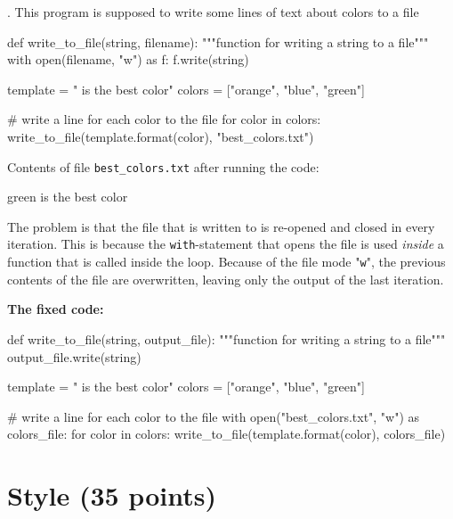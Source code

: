 . This program is supposed to write some lines of text about colors to a file

\begin{pythoncode}
def write_to_file(string, filename):
    """function for writing a string to a file"""
    with open(filename, "w") as f:
        f.write(string)

template    = "{} is the best color"
colors      = ["orange", "blue", "green"]

# write a line for each color to the file
for color in colors:
    write_to_file(template.format(color), "best_colors.txt")
\end{pythoncode}

\noindent Contents of file \texttt{best\_colors.txt} after running the code:

\begin{outputcode}
green is the best color
\end{outputcode}

\begin{solution}
    The problem is that the file that is written to is re-opened and closed in every iteration. This is because the \texttt{with}-statement that opens the file is used \textit{inside} a function that is called inside the loop. Because of the file mode "\texttt{w}", the previous contents of the file are overwritten, leaving only the output of the last iteration.

    \vspace{1em}

    \noindent \textbf{The fixed code:}

    \begin{pythoncode}
def write_to_file(string, output_file):
    """function for writing a string to a file"""
    output_file.write(string)

template    = "{} is the best color"
colors      = ["orange", "blue", "green"]

# write a line for each color to the file
with open("best_colors.txt", "w") as colors_file:
    for color in colors:
        write_to_file(template.format(color), colors_file)
    \end{pythoncode}

\end{solution}


\section{Style (35 points)}

